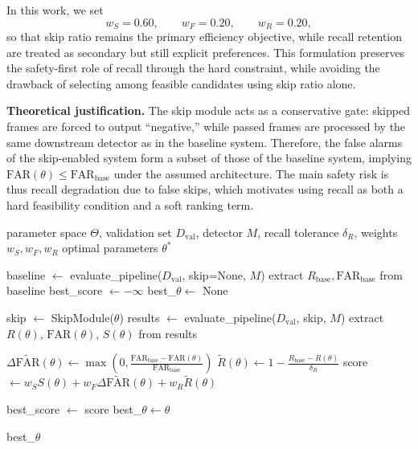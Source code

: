 \documentclass{article}
\begin{document}
	In this work, we set
	\[
	w_S=0.60,\qquad
	w_F=0.20,\qquad
	w_R=0.20,
	\]
	so that skip ratio remains the primary efficiency objective, while recall retention are treated as secondary but still explicit preferences. This formulation preserves the safety-first role of recall through the hard constraint, while avoiding the drawback of selecting among feasible candidates using skip ratio alone.

	\textbf{Theoretical justification.}
	The skip module acts as a conservative gate: skipped frames are forced to output ``negative,'' while passed frames are processed by the same downstream detector as in the baseline system. Therefore, the false alarms of the skip-enabled system form a subset of those of the baseline system, implying $\mathrm{FAR}(\theta)\leq \mathrm{FAR}_{\text{base}}$ under the assumed architecture. The main safety risk is thus recall degradation due to false skips, which motivates using recall as both a hard feasibility condition and a soft ranking term.

	\begin{algorithm}[htbp]
		\caption{Skip Module Hyperparameter Selection}
		\begin{algorithmic}[1]
			\Require parameter space $\Theta$, validation set $D_{\text{val}}$, detector $M$, recall tolerance $\delta_R$, weights $w_S,w_F,w_R$
			\Ensure optimal parameters $\theta^*$

			\State baseline $\gets$ evaluate\_pipeline($D_{\text{val}}$, skip=None, $M$)
			\State extract $R_{\text{base}}, \mathrm{FAR}_{\text{base}}$ from baseline
			\State best\_score $\gets -\infty$
			\State best\_$\theta \gets$ None

			\For{$\theta \in \Theta$}
			\State skip $\gets$ SkipModule($\theta$)
			\State results $\gets$ evaluate\_pipeline($D_{\text{val}}$, skip, $M$)
			\State extract $R(\theta)$, $\mathrm{FAR}(\theta)$, $S(\theta)$ from results

			\State $\Delta \widetilde{\mathrm{FAR}}(\theta)\gets
			\max\left(0,\frac{\mathrm{FAR}_{\text{base}}-\mathrm{FAR}(\theta)}{\mathrm{FAR}_{\text{base}}}\right)$
			\State $\widetilde{R}(\theta)\gets
			1-\frac{R_{\text{base}}-R(\theta)}{\delta_R}$
			\State score $\gets
			w_S S(\theta)+w_F \Delta \widetilde{\mathrm{FAR}}(\theta)+w_R \widetilde{R}(\theta)$

			\State best\_score $\gets$ score
			\State best\_$\theta \gets \theta$
			\EndIf
			\EndIf
			\EndFor

			\State \Return best\_$\theta$
		\end{algorithmic}
	\end{algorithm}
\end{document}
